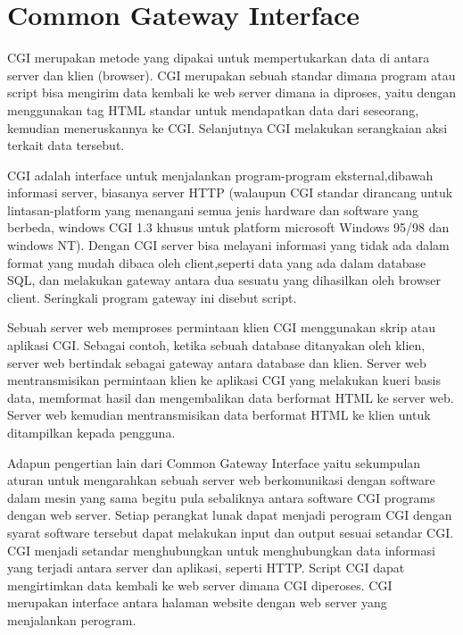 


\section{Common Gateway Interface}
CGI merupakan metode yang dipakai untuk mempertukarkan data di antara server dan klien (browser). CGI merupakan sebuah standar dimana program atau script bisa mengirim data kembali ke web server dimana ia diproses, yaitu dengan menggunakan tag HTML standar untuk mendapatkan data dari seseorang, kemudian meneruskannya ke CGI. Selanjutnya CGI melakukan serangkaian aksi terkait data tersebut\cite{prihatmoko2013pengembangan}.



\par CGI adalah interface untuk menjalankan program-program eksternal,dibawah informasi server, biasanya server HTTP (walaupun CGI standar dirancang untuk lintasan-platform yang
menangani semua jenis hardware dan software yang berbeda, windows CGI 1.3 khusus untuk platform microsoft Windows 95/98 dan windows NT). Dengan CGI server bisa
melayani informasi yang tidak ada dalam format yang mudah dibaca oleh client,seperti data yang ada dalam database SQL, dan melakukan gateway antara dua sesuatu yang 
dihasilkan oleh browser client. Seringkali program gateway ini disebut script.

\par Sebuah server web memproses permintaan klien CGI menggunakan skrip atau aplikasi CGI. Sebagai contoh, ketika sebuah database ditanyakan oleh klien, 
server web bertindak sebagai gateway antara database dan klien. Server web mentransmisikan permintaan klien ke aplikasi CGI yang melakukan kueri basis data,
 memformat hasil dan mengembalikan data berformat HTML ke server web. Server web kemudian mentransmisikan data berformat HTML ke klien untuk ditampilkan kepada pengguna.




\par Adapun pengertian lain dari Common Gateway Interface yaitu sekumpulan aturan untuk mengarahkan sebuah server web berkomunikasi dengan software dalam mesin yang sama begitu pula sebaliknya antara software CGI programs dengan web server. Setiap perangkat lunak dapat menjadi perogram CGI dengan syarat software tersebut dapat melakukan input dan output sesuai setandar CGI. CGI menjadi setandar menghubungkan untuk menghubungkan data informasi yang terjadi antara server dan aplikasi, seperti HTTP. Script CGI dapat mengirtimkan data kembali ke web server  dimana CGI diperoses. CGI merupakan interface antara halaman website dengan web server yang menjalankan perogram\cite{aditya2015analisis}.

